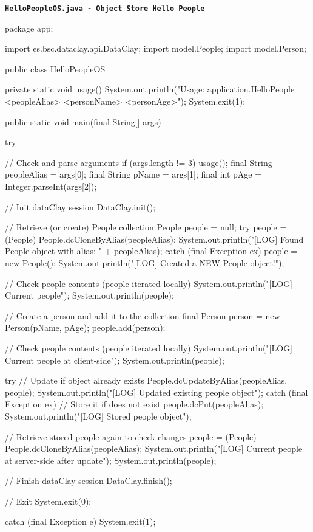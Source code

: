 \begin{tBox}
\texttt{\bfseries\textcolor{basecolor}{HelloPeopleOS.java - Object Store Hello People}}
\begin{java}
package app;

import es.bsc.dataclay.api.DataClay;
import model.People;
import model.Person;

public class HelloPeopleOS {
    private static void usage() {
        System.out.println("Usage: application.HelloPeople <peopleAlias> <personName> <personAge>");
        System.exit(1);
    }

    public static void main(final String[] args) {
        try {
            // Check and parse arguments
            if (args.length != 3) {
                    usage();
            }
            final String peopleAlias = args[0];
            final String pName = args[1];
            final int pAge = Integer.parseInt(args[2]);

            // Init dataClay session
            DataClay.init();

            // Retrieve (or create) People collection 
            People people = null;
            try {
                people = (People) People.dcCloneByAlias(peopleAlias);
                System.out.println("[LOG] Found People object with alias: " + peopleAlias);
            } catch (final Exception ex) {
                people = new People();
                System.out.println("[LOG] Created a NEW People object!");
            }

            // Check people contents (people iterated locally)
            System.out.println("[LOG] Current people");
            System.out.println(people);

            // Create a person and add it to the collection
            final Person person = new Person(pName, pAge);
            people.add(person);

            // Check people contents (people iterated locally)
            System.out.println("[LOG] Current people at client-side");
            System.out.println(people);

            try {
                // Update if object already exists
                People.dcUpdateByAlias(peopleAlias, people);
                System.out.println("[LOG] Updated existing people object");
            } catch (final Exception ex) {
                // Store it if does not exist
                people.dcPut(peopleAlias);
                System.out.println("[LOG] Stored people object");
            }

            // Retrieve stored people again to check changes
            people = (People) People.dcCloneByAlias(peopleAlias);
            System.out.println("[LOG] Current people at server-side after update");
            System.out.println(people);

            // Finish dataClay session
            DataClay.finish();

            // Exit
            System.exit(0);
        } catch (final Exception e) {
            System.exit(1);
        }
    }
}

\end{java}
\end{tBox}

